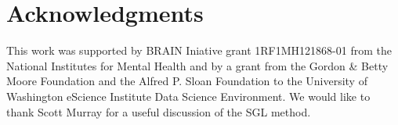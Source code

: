 




\section*{Acknowledgments}

This work was supported by BRAIN Iniative grant 1RF1MH121868-01 from the
National Institutes for Mental Health and by a grant from the Gordon \& Betty
Moore Foundation and the Alfred P. Sloan Foundation to the University of
Washington eScience Institute Data Science Environment. We would like to thank
Scott Murray for a useful discussion of the SGL method.